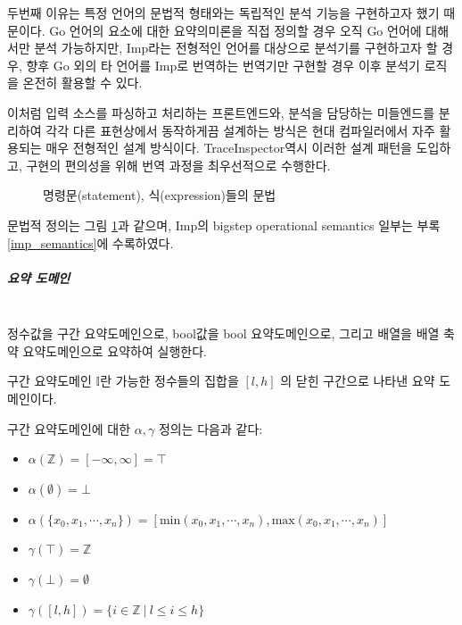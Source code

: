 \documentclass[a4paper,12pt]{article}
\newcommand{\imp}{\textsf{Imp}}
\newcommand{\traceinspector}{\textsf{TraceInspector}}
\newcommand{\interval}[2]{[ #1, #2 ]}
\begin{document}
두번째 이유는 특정 언어의 문법적 형태와는 독립적인 분석 기능을 구현하고자 했기 때문이다. Go 언어의 요소에 대한 요약의미론을 직접 정의할 경우 오직 Go 언어에 대해서만 분석 가능하지만,
\imp 라는 전형적인 언어를 대상으로 분석기를 구현하고자 할 경우, 향후 Go 외의 타 언어를 \imp 로 번역하는 번역기만 구현할 경우 이후 분석기 로직을 온전히 활용할 수 있다.

이처럼 입력 소스를 파싱하고 처리하는 프론트엔드와, 분석을 담당하는 미들엔드를 분리하여 각각 다른 표현상에서 동작하게끔 설계하는 방식은 현대 컴파일러에서 자주 활용되는 매우 전형적인 설계 방식이다.
\traceinspector 역시 이러한 설계 패턴을 도입하고, 구현의 편의성을 위해  번역 과정을 최우선적으로 수행한다.

\begin{figure}[t]
    \centering
    

    \caption{ 명령문(statement), 식(expression)들의 문법}
    \label{fig:imp_syntax}
    
\end{figure}

 문법적 정의는 그림 \ref{fig:imp_syntax}과 같으며, \imp 의 bigstep operational semantics 일부는 부록 \ref{imp_semantics}에 수록하였다.

\subparagraph{요약 도메인} ~\\

 정수값을 구간 요약도메인으로, bool값을 bool 요약도메인으로, 그리고 배열을 배열 축약 요약도메인으로 요약하여 실행한다.

구간 요약도메인 $\mathbb{I}$란 가능한 정수들의 집합을 $\interval{l}{h}$ 의 닫힌 구간으로 나타낸 요약 도메인이다. 

구간 요약도메인에 대한 $\alpha, \gamma$ 정의는 다음과 같다:

\begin{itemize}
    \item $\alpha(\mathbb{Z}) = [-\infty, \infty] = \top$
    \item $\alpha(\emptyset) = \bot$
    \item $\alpha(\{x_0, x_1, \cdots, x_n\}) = [\mathrm{min}(x_0, x_1, \cdots, x_n), \mathrm{max}(x_0, x_1, \cdots, x_n)]$
\end{itemize}

\begin{itemize}
    \item $\gamma(\top) = \mathbb{Z}$
    \item $\gamma(\bot) = \emptyset$
    \item $\gamma(\interval{l}{h}) = \{ i \in \mathbb{Z} \ | \ l \leq i \leq h \}$
\end{itemize}
\end{document}
